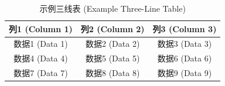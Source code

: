 \documentclass{article}
\begin{document}
\begin{table}[h]
\centering
\caption{示例三线表 (Example Three-Line Table)}
\label{tab:example}
\begin{tabular}{ccc}
\toprule
列1 (Column 1) & 列2 (Column 2) & 列3 (Column 3) \\
\midrule
数据1 (Data 1) & 数据2 (Data 2) & 数据3 (Data 3) \\
数据4 (Data 4) & 数据5 (Data 5) & 数据6 (Data 6) \\
数据7 (Data 7) & 数据8 (Data 8) & 数据9 (Data 9) \\
\bottomrule
\end{tabular}
\end{table}
\end{document}
